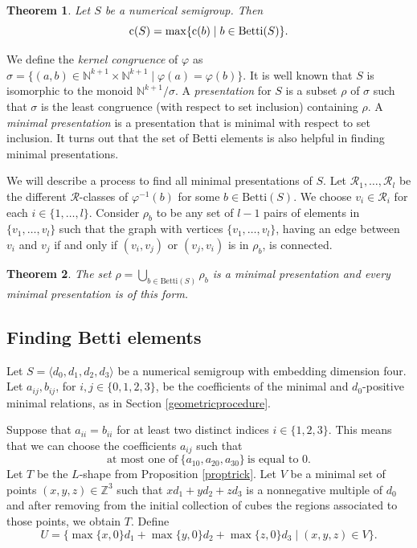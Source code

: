 \documentclass[12pt]{article}
\newtheorem{thm}{Theorem}[section]
\theoremstyle{remark}
\begin{document}
\begin{thm}\label{theoremcatenarybetti}
    \textup{\cite[Theorem 15]{AssiDAnnaGarciaSanchez2020}} Let $S$ be a numerical semigroup. Then $$ \textup{c}(S) = \max \{\textup{c}(b) \mid b \in \textup{Betti}(S) \}.$$
\end{thm}


We define the \emph{kernel congruence} of $\varphi$ as $\sigma = \{ (a,b) \in \mathbb{N}^{k+1} \times \mathbb{N}^{k+1} \mid \varphi(a) = \varphi(b) \}$. It is well known that $S$ is isomorphic to the monoid $\mathbb{N}^{k+1} / \sigma$. 
A \emph{presentation} for $S$ is a subset $\rho$ of $\sigma$ such that $\sigma$ is the least congruence (with respect to set inclusion) containing $\rho$. A \emph{minimal presentation} is a presentation that is minimal with respect to set inclusion.
It turns out that the set of Betti elements is also helpful in finding minimal presentations.

We will describe a process to find all minimal presentations of $S$. Let $\mathcal{R}_1, \dots, \mathcal{R}_l$ be the different $\mathcal{R}$-classes of $\varphi^{-1}(b)$ for some $b \in \text{Betti}(S)$. We choose $v_i \in \mathcal{R}_i$ for each $i \in \{1,\dots,l\}$. Consider $\rho_b$ to be any set of $l-1$ pairs of elements in $\{v_1, \dots, v_l\}$ such that the graph with vertices $\{v_1, \dots, v_l\}$, having an edge between $v_i$ and $v_j$ if and only if $(v_i,v_j)$ or $(v_j,v_i)$ is in $\rho_b$, is connected. 
\begin{thm}\label{theorem_minimalpresentation}
    \textup{\cite{Rosales1996MinimalRelation}} The set $\rho = \bigcup_{b \in \text{Betti}(S)} \rho_b$ is a minimal presentation and every minimal presentation is of this form.
\end{thm}


\subsection{Finding Betti elements}

Let $S = \langle d_0,d_1,d_2,d_3 \rangle$ be a numerical semigroup with embedding dimension four. Let $a_{ij}, b_{ij}$, for $i,j \in \{0,1,2,3\}$, be the coefficients of the minimal and $d_0$-positive minimal relations, as in Section \ref{geometricprocedure}.


Suppose that $a_{ii} = b_{ii}$ for at least two distinct indices $i \in \{1,2,3\}$. This means that we can choose the coefficients $a_{ij}$ such that
\begin{equation}\label{catenary_assumption}
    \text{at most one of} \ \{a_{10},a_{20},a_{30}\} \ \text{is equal to 0}.
\end{equation}
Let $T$ be the $L$-shape from Proposition \ref{proptrick}.
Let $V$ be a minimal set of points $(x,y,z) \in \mathbb{Z}^3$ such that $xd_1 + yd_2 +zd_3$ is a nonnegative multiple of $d_0$ and after removing from the initial collection of cubes the regions associated to those points, we obtain $T$. 
Define
$$ U = \{ \max\{ x,0\} d_1 + \max\{y,0\}d_2 + \max\{z,0\}d_3 \mid (x,y,z) \in V \}.$$
\end{document}
